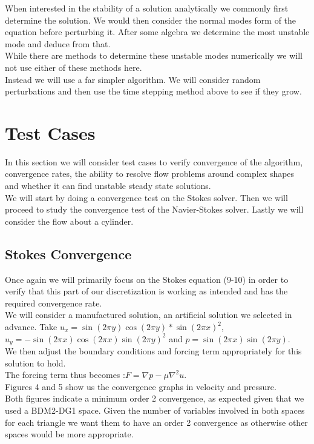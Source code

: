 \documentclass[11pt,twoside,a4paper]{article}
\begin{document}
When interested in the stability of a solution analytically we commonly first determine the solution. We would then consider the normal modes form of the equation before perturbing it. After some algebra we determine the most unstable mode and deduce from that.\\
While there are methods to determine these unstable modes numerically we will not use either of these methods here.\\
Instead we will use a far simpler algorithm.
We will consider random perturbations and then use the time stepping method above to see if they grow.

\section{Test Cases}
In this section we will consider test cases to verify convergence of the algorithm, convergence rates, the ability to resolve flow problems around complex shapes and whether it can find unstable steady state solutions.\\
We will start by doing a convergence test on the Stokes solver. Then we will proceed to study the convergence test of the Navier-Stokes solver. Lastly we will consider the flow about a cylinder.
\subsection{Stokes Convergence}

Once again we will primarily focus on the Stokes equation (9-10) in order to verify that this part of our discretization is working as intended and has the required convergence rate.\\
We will consider a manufactured solution, an artificial solution we selected in advance. Take $u_x = \sin(2 \pi y) \cos(2 \pi y)*\sin(2 \pi x)^2$, $u_y= -\sin(2 \pi x) \cos(2 \pi x) \sin(2 \pi y)^2$ and $p = \sin(2 \pi x) \sin(2 \pi y)$.\\
We then adjust the boundary conditions and forcing term appropriately for this solution to hold.\\
 The forcing term thus becomes :$F = \nabla p - \mu \nabla^2 u$.\\
Figures 4 and 5 show us the convergence graphs in velocity and pressure.\\
Both figures indicate a minimum order 2 convergence, as expected given that we used a BDM2-DG1 space. Given the number of variables involved in both spaces for each triangle we want them to have an order 2 convergence as otherwise other spaces would be more appropriate.
\\
\end{document}
